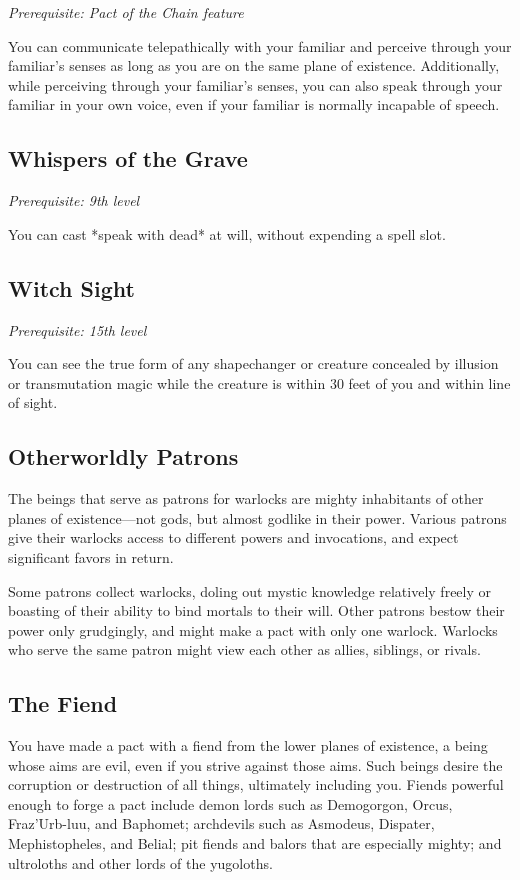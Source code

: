 \textit{Prerequisite: Pact of the Chain feature}

You can communicate telepathically with your familiar and perceive through your familiar’s senses as long as you are on the same plane of existence. Additionally, while perceiving through your familiar’s senses, you can also speak through your familiar in your own voice, even if your familiar is normally incapable of speech.

\subsection{Whispers of the Grave}

\textit{Prerequisite: 9th level}

You can cast *speak with dead* at will, without expending a spell slot.

\subsection{Witch Sight}

\textit{Prerequisite: 15th level}

You can see the true form of any shapechanger or creature concealed by illusion or transmutation magic while the creature is within 30 feet of you and within line of sight.

\subsection{Otherworldly Patrons}

The beings that serve as patrons for warlocks are mighty inhabitants of other planes of existence—not gods, but almost godlike in their power. Various patrons give their warlocks access to different powers and invocations, and expect significant favors in return.

Some patrons collect warlocks, doling out mystic knowledge relatively freely or boasting of their ability to bind mortals to their will. Other patrons bestow their power only grudgingly, and might make a pact with only one warlock. Warlocks who serve the same patron might view each other as allies, siblings, or rivals.

\subsection{The Fiend}

You have made a pact with a fiend from the lower planes of existence, a being whose aims are evil, even if you strive against those aims. Such beings desire the corruption or destruction of all things, ultimately including you. Fiends powerful enough to forge a pact include demon lords such as Demogorgon, Orcus, Fraz’Urb-luu, and Baphomet; archdevils such as Asmodeus, Dispater, Mephistopheles, and Belial; pit fiends and balors that are especially mighty; and ultroloths and other lords of the yugoloths.

